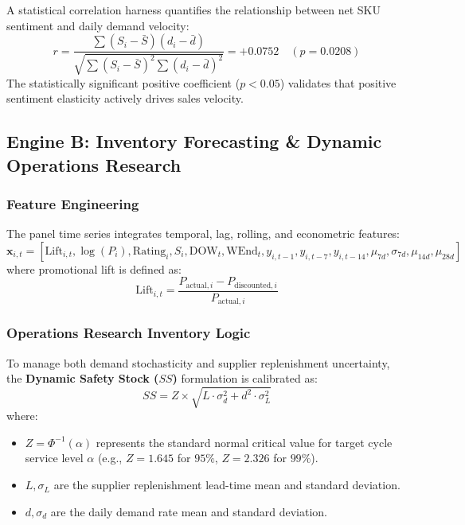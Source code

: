 \documentclass[11pt,a4paper]{article}
\begin{document}
A statistical correlation harness quantifies the relationship between net SKU sentiment and daily demand velocity:
\begin{equation}
    r = \frac{\sum (S_i - \bar{S})(d_i - \bar{d})}{\sqrt{\sum (S_i - \bar{S})^2 \sum (d_i - \bar{d})^2}} = +0.0752 \quad (p = 0.0208)
\end{equation}
The statistically significant positive coefficient ($p < 0.05$) validates that positive sentiment elasticity actively drives sales velocity.

\subsection{Engine B: Inventory Forecasting \& Dynamic Operations Research}

\subsubsection{Feature Engineering}
The panel time series integrates temporal, lag, rolling, and econometric features:
\begin{equation}
    \mathbf{x}_{i,t} = \left[ \text{Lift}_{i,t}, \log(P_{i}), \text{Rating}_i, S_i, \text{DOW}_t, \text{WEnd}_t, y_{i, t-1}, y_{i, t-7}, y_{i, t-14}, \mu_{7d}, \sigma_{7d}, \mu_{14d}, \mu_{28d} \right]
\end{equation}
where promotional lift is defined as:
\begin{equation}
    \text{Lift}_{i,t} = \frac{P_{\text{actual}, i} - P_{\text{discounted}, i}}{P_{\text{actual}, i}}
\end{equation}

\subsubsection{Operations Research Inventory Logic}
To manage both demand stochasticity and supplier replenishment uncertainty, the \textbf{Dynamic Safety Stock ($SS$)} formulation is calibrated as:
\begin{equation}
    SS = Z \times \sqrt{L \cdot \sigma_d^2 + d^2 \cdot \sigma_L^2}
\end{equation}
where:
\begin{itemize}[leftmargin=1.5em, itemsep=2pt]
    \item $Z = \Phi^{-1}(\alpha)$ represents the standard normal critical value for target cycle service level $\alpha$ (e.g., $Z = 1.645$ for $95\%$, $Z = 2.326$ for $99\%$).
    \item $L, \sigma_L$ are the supplier replenishment lead-time mean and standard deviation.
    \item $d, \sigma_d$ are the daily demand rate mean and standard deviation.
\end{itemize}
\end{document}
